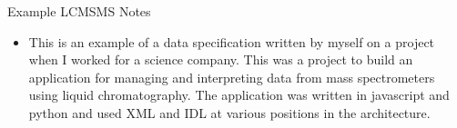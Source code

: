 \ifNotesnAll
\begin{frame}Example LCMSMS Notes
\begin{itemize}
  \item This is an example of a data specification written by myself on a project when I worked for a science company. This was a project to build an application for managing and interpreting data from mass spectrometers using liquid chromatography. The application was written in javascript and python and used XML and IDL at various positions in the architecture.
\end{itemize}
\end{frame}
\fi

